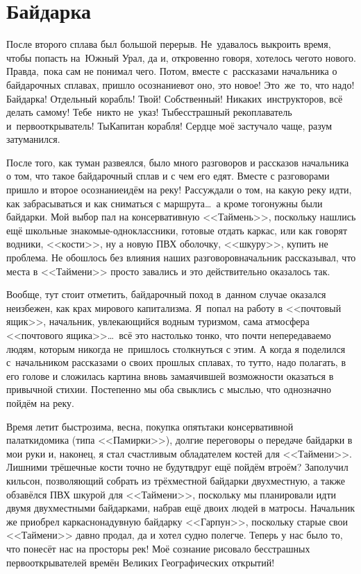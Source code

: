 \chapter{Байдарка}

После второго сплава был большой перерыв. Не~удавалось выкроить время, чтобы попасть на~Южный Урал, да и, откровенно говоря, хотелось чего\sdash то нового. Правда,~пока сам не понимал чего. Потом, вместе с~рассказами начальника о байдарочных сплавах, пришло осознание\mdash вот оно, это новое! Это~же~то, что надо! Байдарка! Отдельный корабль! Твой! Собственный! Никаких~инструкторов, всё делать самому! Тебе~никто не~указ! Ты\mdash бесстрашный рекоплаватель и~первооткрыватель! Ты\mdash Капитан корабля! Сердце моё застучало чаще, разум затуманился. 

После того, как туман развеялся, было много разговоров и рассказов начальника о том, что такое байдарочный сплав и с чем его едят. Вместе с разговорами пришло и второе осознание\mdash идём на реку! Рассуждали о том, на какую реку идти, как забрасываться и как сниматься с маршрута\ldots~а кроме того\mdash нужны были байдарки. Мой выбор пал на консервативную <<Таймень>>, поскольку нашлись ещё школьные знакомые-одноклассники, готовые отдать каркас, или как говорят водники, <<кости>>, ну а новую ПВХ оболочку, <<шкуру>>, купить не проблема. Не обошлось без влияния наших разговоров\mdash начальник рассказывал, что места в <<Таймени>> просто завались и это действительно оказалось так.

Вообще, тут стоит отметить, байдарочный поход в~данном случае оказался неизбежен, как крах мирового капитализма. Я~попал на работу в <<почтовый ящик>>, начальник, увлекающийся водным туризмом, сама атмосфера <<почтового ящика>>\ldots~всё это настолько тонко, что почти непередаваемо людям, которым никогда не~пришлось столкнуться с этим. А когда я поделился с~начальником рассказами о своих прошлых сплавах, то тут\sdash то, надо полагать, в его голове и сложилась картина вновь замаячившей возможности оказаться в привычной стихии. Постепенно мы оба свыклись с мыслью, что однозначно пойдём на реку.

Время летит быстро\mdash зима, весна, покупка опять\sdash таки консервативной палатки\sdash домика (типа <<Памирки>>), долгие переговоры о передаче байдарки в мои руки и, наконец, я стал счастливым обладателем костей для <<Таймени>>. Лишними трёшечные кости точно не будут\mdash вдруг ещё пойдём втроём? Заполучил кильсон, позволяющий собрать из трёхместной байдарки двухместную, а также обзавёлся ПВХ шкурой для <<Таймени>>, поскольку мы планировали идти двумя двухместными байдарками, набрав ещё двоих людей в матросы. Начальник же приобрел каркасно\sdash надувную байдарку <<Гарпун>>, поскольку старые свои <<Таймени>> давно продал, да и хотел судно полегче. Теперь у нас было то, что понесёт нас на просторы рек! Моё сознание рисовало бесстрашных первооткрывателей времён Великих Географических открытий!

